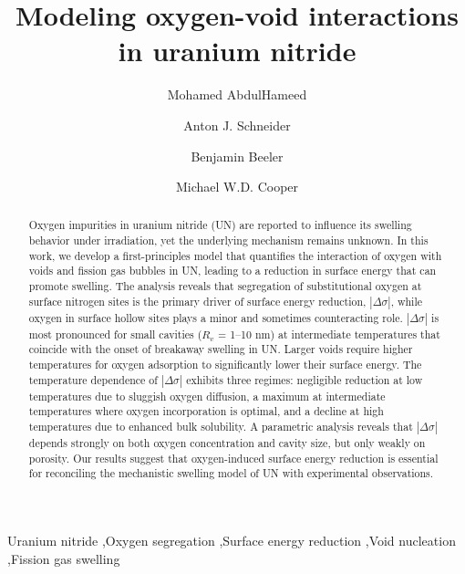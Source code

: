 \documentclass[preprint,12pt,sort&compress]{elsarticle}
\newcommand{\?}{\stackrel{?}{=}}
\begin{document}
\begin{frontmatter}

\title{Modeling oxygen-void interactions in uranium nitride}

\author[ncsu]{Mohamed AbdulHameed}
\author[lanl]{Anton J. Schneider}
\author[ncsu,inl]{Benjamin Beeler}
\author[lanl]{Michael W.D. Cooper}

\address[ncsu]{Department of Nuclear Engineering, North Carolina State University, Raleigh, NC 27695}
\address[lanl]{Los Alamos National Laboratory, Los Alamos, NM 87545}
\address[inl]{Idaho National Laboratory, Idaho Falls, ID 83415}

\begin{abstract}

Oxygen impurities in uranium nitride (UN) are reported to influence its swelling behavior under irradiation, yet the underlying mechanism remains unknown. In this work, we develop a first-principles model that quantifies the interaction of oxygen with voids and fission gas bubbles in UN, leading to a reduction in surface energy that can promote swelling. The analysis reveals that segregation of substitutional oxygen at surface nitrogen sites is the primary driver of surface energy reduction, $|\Delta \sigma|$, while oxygen in surface hollow sites plays a minor and sometimes counteracting role. $|\Delta \sigma|$ is most pronounced for small cavities ($R_v$ = 1--10 nm) at intermediate temperatures that coincide with the onset of breakaway swelling in UN. Larger voids require higher temperatures for oxygen adsorption to significantly lower their surface energy. The temperature dependence of $|\Delta \sigma|$ exhibits three regimes: negligible reduction at low temperatures due to sluggish oxygen diffusion, a maximum at intermediate temperatures where oxygen incorporation is optimal, and a decline at high temperatures due to enhanced bulk solubility. A parametric analysis reveals that $|\Delta \sigma|$ depends strongly on both oxygen concentration and cavity size, but only weakly on porosity. Our results suggest that oxygen-induced surface energy reduction is essential for reconciling the mechanistic swelling model of UN with experimental observations.

\end{abstract}

\begin{keyword}
Uranium nitride \sep Oxygen segregation \sep Surface energy reduction \sep Void nucleation \sep Fission gas swelling
\end{keyword}

\end{frontmatter}
\end{document}
